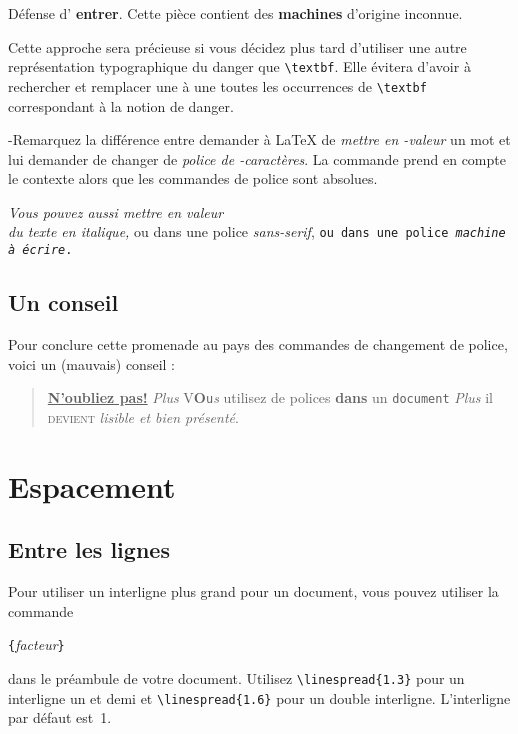 \begin{example}
\newcommand{\danger}[1]{%
 \textbf{#1}}
Défense d'\danger{entrer}.
Cette pièce contient des
\danger{machines} d'origine 
inconnue.
\end{example}

Cette approche sera précieuse si vous décidez plus tard
d'utiliser une autre représentation typographique du danger que
\verb|\textbf|. Elle évitera d'avoir à rechercher et remplacer une à
une toutes les occurrences de \verb|\textbf| correspondant à la notion
de danger. 

-Remarquez la différence entre demander à \LaTeX{} de \emph{mettre en
-valeur} un mot et lui demander de changer de \emph{police de
-caractères}. La commande  prend en compte le contexte alors
que les commandes de police sont absolues.

\begin{example}
\textit{Vous pouvez aussi
  \emph{mettre en valeur}\\
  du texte en italique,}
\textsf{ou dans une police
  \emph{sans-serif},}
\texttt{ou dans une police
  \emph{machine à écrire}.}
\end{example}

\subsection{Un conseil}

Pour conclure cette promenade au pays des commandes de changement de
police, voici un (mauvais) conseil :
\begin{quote}
  \underline{\textbf{N'oubliez pas\Huge!}} \textit{Plus}
  \textsf{V\textbf{\LARGE O}\texttt{u}\textsl{s}} \Huge utilisez
  \tiny de polices \footnotesize \textbf{dans} un \small \texttt{document}
  \large \textit{Plus} \normalsize il \textsc{devient} 
  \textsl{\textsf{lisible} et bien prés\large e\Large n\LARGE t\huge é}.
\end{quote}


\section{Espacement}
 
\subsection{Entre les lignes}

 Pour utiliser un interligne plus grand pour un
document, vous pouvez utiliser la commande
\begin{lscommand}
\verb|{|\emph{facteur}\verb|}|
\end{lscommand}
\noindent dans le préambule de votre document. Utilisez
\verb|\linespread{1.3}| pour un interligne \og un et demi \fg{} et
\verb|\linespread{1.6}| pour un \og double \fg{}
interligne. L'interligne par défaut est~1.


